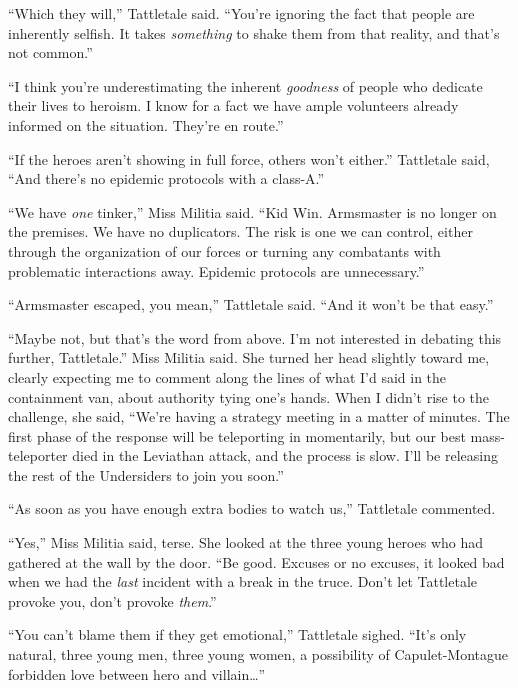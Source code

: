 ``Which they will,'' Tattletale said.  ``You're ignoring the fact that people are inherently selfish.  It takes \emph{something} to shake them from that reality, and that's not common.''



``I think you're underestimating the inherent \emph{good}\emph{ness} of people who dedicate their lives to heroism.  I know for a fact we have ample volunteers already informed on the situation.  They're en route.''



``If the heroes aren't showing in full force, others won't either.'' Tattletale said, ``And there's no epidemic protocols with a class-A.''



``We have \emph{one} tinker,'' Miss Militia said.  ``Kid Win.  Armsmaster is no longer on the premises.  We have no duplicators.  The risk is one we can control, either through the organization of our forces or turning any combatants with problematic interactions away.  Epidemic protocols are unnecessary.''



``Armsmaster escaped, you mean,'' Tattletale said.  ``And it won't be that easy.''



``Maybe not, but that's the word from above.  I'm not interested in debating this further, Tattletale.'' Miss Militia said.  She turned her head slightly toward me, clearly expecting me to comment along the lines of what I'd said in the containment van, about authority tying one's hands.  When I didn't rise to the challenge, she said, ``We're having a strategy meeting in a matter of minutes.  The first phase of the response will be teleporting in momentarily, but our best mass-teleporter died in the Leviathan attack, and the process is slow.  I'll be releasing the rest of the Undersiders to join you soon.''



``As soon as you have enough extra bodies to watch us,'' Tattletale commented.



``Yes,'' Miss Militia said, terse.  She looked at the three young heroes who had gathered at the wall by the door.  ``Be good.  Excuses or no excuses, it looked bad when we had the \emph{last} incident with a break in the truce.  Don't let Tattletale provoke you, don't provoke \emph{them}.''



``You can't blame them if they get emotional,'' Tattletale sighed.  ``It's only natural, three young men, three young women, a possibility of Capulet-Montague forbidden love between hero and villain\ldots''



